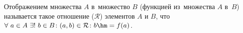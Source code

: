 \label{deffunc}
    Отображением множества $A$ в~множество $B$ (функцией из~множества $A$ в~$B$) называется такое отношение 
    ($\mathcal R$) элементов $A$ и $B$, что $\forall\  a\in A\ \exists!\ b\in B\colon(a,b)\in \mathcal R\colon b\hm=f(a)$.
